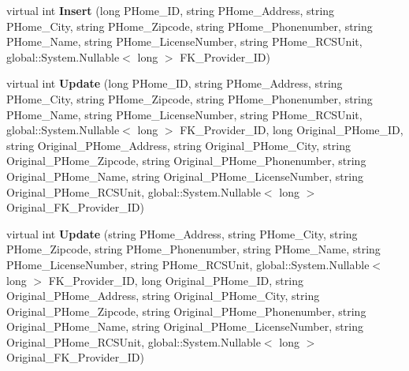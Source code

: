 \begin{DoxyCompactItemize}
\item 
\mbox{\label{class_a_f_h___scheduler_1_1_home_inspection_data_set_table_adapters_1_1_provider___homes_table_adapter_a34bfb120e48c260b4c10de9bdbbaa4cc}} 
virtual int {\bfseries Insert} (long P\+Home\+\_\+\+ID, string P\+Home\+\_\+\+Address, string P\+Home\+\_\+\+City, string P\+Home\+\_\+\+Zipcode, string P\+Home\+\_\+\+Phonenumber, string P\+Home\+\_\+\+Name, string P\+Home\+\_\+\+License\+Number, string P\+Home\+\_\+\+R\+C\+S\+Unit, global\+::\+System.\+Nullable$<$ long $>$ F\+K\+\_\+\+Provider\+\_\+\+ID)
\item 
\mbox{\label{class_a_f_h___scheduler_1_1_home_inspection_data_set_table_adapters_1_1_provider___homes_table_adapter_ad53bbff5c55d745bbe131cc81c1f5cbc}} 
virtual int {\bfseries Update} (long P\+Home\+\_\+\+ID, string P\+Home\+\_\+\+Address, string P\+Home\+\_\+\+City, string P\+Home\+\_\+\+Zipcode, string P\+Home\+\_\+\+Phonenumber, string P\+Home\+\_\+\+Name, string P\+Home\+\_\+\+License\+Number, string P\+Home\+\_\+\+R\+C\+S\+Unit, global\+::\+System.\+Nullable$<$ long $>$ F\+K\+\_\+\+Provider\+\_\+\+ID, long Original\+\_\+\+P\+Home\+\_\+\+ID, string Original\+\_\+\+P\+Home\+\_\+\+Address, string Original\+\_\+\+P\+Home\+\_\+\+City, string Original\+\_\+\+P\+Home\+\_\+\+Zipcode, string Original\+\_\+\+P\+Home\+\_\+\+Phonenumber, string Original\+\_\+\+P\+Home\+\_\+\+Name, string Original\+\_\+\+P\+Home\+\_\+\+License\+Number, string Original\+\_\+\+P\+Home\+\_\+\+R\+C\+S\+Unit, global\+::\+System.\+Nullable$<$ long $>$ Original\+\_\+\+F\+K\+\_\+\+Provider\+\_\+\+ID)
\item 
\mbox{\label{class_a_f_h___scheduler_1_1_home_inspection_data_set_table_adapters_1_1_provider___homes_table_adapter_a9b6a4ee5cfaaaa85f0e3fe94e2472c6d}} 
virtual int {\bfseries Update} (string P\+Home\+\_\+\+Address, string P\+Home\+\_\+\+City, string P\+Home\+\_\+\+Zipcode, string P\+Home\+\_\+\+Phonenumber, string P\+Home\+\_\+\+Name, string P\+Home\+\_\+\+License\+Number, string P\+Home\+\_\+\+R\+C\+S\+Unit, global\+::\+System.\+Nullable$<$ long $>$ F\+K\+\_\+\+Provider\+\_\+\+ID, long Original\+\_\+\+P\+Home\+\_\+\+ID, string Original\+\_\+\+P\+Home\+\_\+\+Address, string Original\+\_\+\+P\+Home\+\_\+\+City, string Original\+\_\+\+P\+Home\+\_\+\+Zipcode, string Original\+\_\+\+P\+Home\+\_\+\+Phonenumber, string Original\+\_\+\+P\+Home\+\_\+\+Name, string Original\+\_\+\+P\+Home\+\_\+\+License\+Number, string Original\+\_\+\+P\+Home\+\_\+\+R\+C\+S\+Unit, global\+::\+System.\+Nullable$<$ long $>$ Original\+\_\+\+F\+K\+\_\+\+Provider\+\_\+\+ID)
\end{DoxyCompactItemize}

